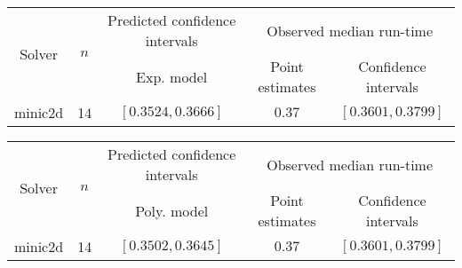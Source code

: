 \begin{tabular}{ccccc}
\hline 
\multirow{2}{*}{Solver} & \multirow{2}{*}{$n$} & Predicted confidence intervals & \multicolumn{2}{c}{Observed median  run-time}\tabularnewline
 &  & Exp. model  & Point estimates  & Confidence intervals\tabularnewline
\hline 
\hline 
\multirow{0}{*}{minic2d} & 14 & $\mathbf{\left[0.3524,0.3666\right]}$ & $0.37$ & $\left[0.3601,0.3799\right]$ \tabularnewline 
\hline 
\end{tabular} 

\begin{tabular}{ccccc}
\hline 
\multirow{2}{*}{Solver} & \multirow{2}{*}{$n$} & Predicted confidence intervals & \multicolumn{2}{c}{Observed median  run-time}\tabularnewline
 &  & Poly. model  & Point estimates  & Confidence intervals\tabularnewline
\hline 
\hline 
\multirow{0}{*}{minic2d} & 14 & $\mathbf{\left[0.3502,0.3645\right]}$ & $0.37$ & $\left[0.3601,0.3799\right]$ \tabularnewline 
\hline 
\end{tabular} 


